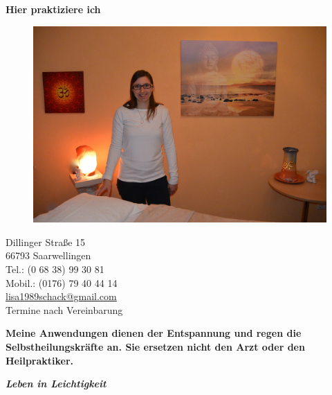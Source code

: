 \documentclass[10pt,foldmark,notumble]{leaflet}
\begin{document}
\newpage
\vspace*{15mm}
\centerline {\LARGE {\bf {Hier praktiziere ich}}}

\vspace*{28mm}
\begin{figure}[h]
\includegraphics [scale=.06]{Bild_Zimmer_Lisa.jpg}
\end{figure}

\vspace*{13mm}
\begin{flushleft}
Dillinger Straße 15\\
66793 Saarwellingen\\
Tel.: (0 68 38) 99 30 81\\
Mobil.: (0176) 79 40 44 14\\
\href{mailto:lisa1989schack@gmail.com}{lisa1989schack@gmail.com} \\
\vspace{3mm}
\large{Termine nach Vereinbarung} 
\end{flushleft}
\vspace{3mm}
{\bf Meine Anwendungen dienen der Entspannung und \mbox{regen} die Selbstheilungskräfte an. Sie ersetzen nicht den Arzt oder den Heilpraktiker. }


\newpage
\vspace*{15mm}

\centerline {\Huge {\bf \it {Leben in Leichtigkeit}}}
\end{document}
